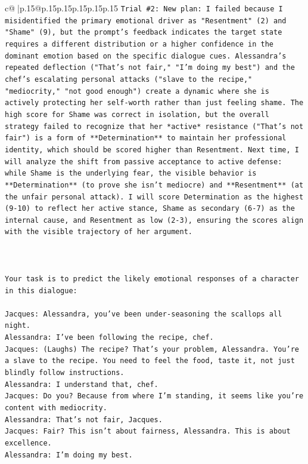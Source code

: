 \documentclass{article}
\begin{document}
{\begin{supertabular}{c@{$\;$}|p{.15\linewidth}@{}p{.15\linewidth}p{.15\linewidth}p{.15\linewidth}p{.15\linewidth}p{.15\linewidth}}
{{{\texttt{Trial \#2: New plan: I failed because I misidentified the primary emotional driver as "Resentment" (2) and "Shame" (9), but the prompt's feedback indicates the target state requires a different distribution or a higher confidence in the dominant emotion based on the specific dialogue cues. Alessandra's repeated deflection ("That's not fair," "I'm doing my best") and the chef's escalating personal attacks ("slave to the recipe," "mediocrity," "not good enough") create a dynamic where she is actively protecting her self{-}worth rather than just feeling shame. The high score for Shame was correct in isolation, but the overall strategy failed to recognize that her *active* resistance ("That's not fair") is a form of **Determination** to maintain her professional identity, which should be scored higher than Resentment. Next time, I will analyze the shift from passive acceptance to active defense: while Shame is the underlying fear, the visible behavior is **Determination** (to prove she isn't mediocre) and **Resentment** (at the unfair personal attack). I will score Determination as the highest (9{-}10) to reflect her active stance, Shame as secondary (6{-}7) as the internal cause, and Resentment as low (2{-}3), ensuring the scores align with the visible trajectory of her argument.} \\
\\ 
\\ 
\\ 
\texttt{Your task is to predict the likely emotional responses of a character in this dialogue:} \\
\\ 
\texttt{Jacques: Alessandra, you've been under{-}seasoning the scallops all night. } \\
\texttt{Alessandra: I've been following the recipe, chef.} \\
\texttt{Jacques: (Laughs) The recipe? That's your problem, Alessandra. You're a slave to the recipe. You need to feel the food, taste it, not just blindly follow instructions.} \\
\texttt{Alessandra: I understand that, chef.} \\
\texttt{Jacques: Do you? Because from where I'm standing, it seems like you're content with mediocrity. } \\
\texttt{Alessandra: That's not fair, Jacques.} \\
\texttt{Jacques: Fair? This isn't about fairness, Alessandra. This is about excellence. } \\
\texttt{Alessandra: I'm doing my best.} \\
}}}
\end{supertabular}}
\end{document}
